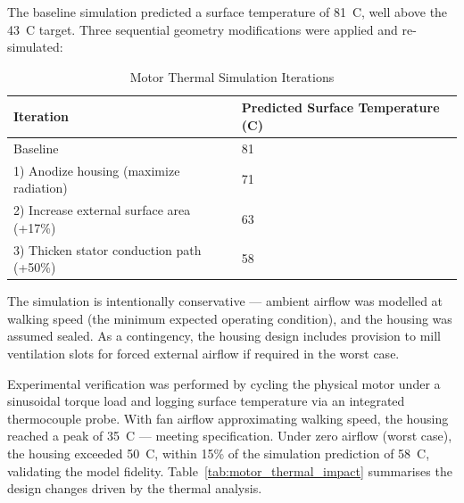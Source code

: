 \documentclass[11pt]{article}
\begin{document}
The baseline simulation predicted a surface temperature of 81~\textdegree{}C, well above the 43~\textdegree{}C target. Three sequential geometry modifications were applied and re-simulated:

\begin{table}[H]
\centering
\caption{Motor Thermal Simulation Iterations}
\label{tab:motor_thermal}
\begin{tabular}{ll}
\toprule
\textbf{Iteration} & \textbf{Predicted Surface Temperature (\textdegree{}C)} \\
\midrule
Baseline & 81 \\
1) Anodize housing (maximize radiation) & 71 \\
2) Increase external surface area (+17\%) & 63 \\
3) Thicken stator conduction path (+50\%) & 58 \\
\bottomrule
\end{tabular}
\end{table}

The simulation is intentionally conservative --- ambient airflow was modelled at walking speed (the minimum expected operating condition), and the housing was assumed sealed. As a contingency, the housing design includes provision to mill ventilation slots for forced external airflow if required in the worst case.

Experimental verification was performed by cycling the physical motor under a sinusoidal torque load and logging surface temperature via an integrated thermocouple probe. With fan airflow approximating walking speed, the housing reached a peak of 35~\textdegree{}C --- meeting specification. Under zero airflow (worst case), the housing exceeded 50~\textdegree{}C, within 15\% of the simulation prediction of 58~\textdegree{}C, validating the model fidelity. Table~\ref{tab:motor_thermal_impact} summarises the design changes driven by the thermal analysis.
\end{document}
